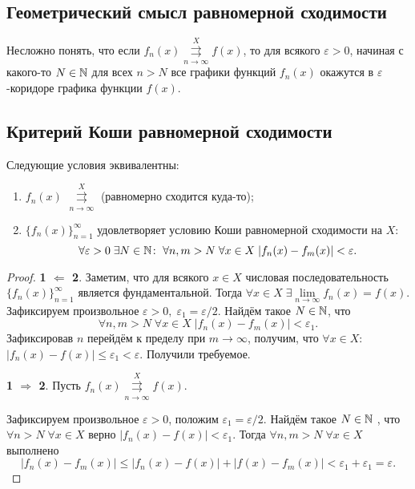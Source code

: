 	\subsection{Геометрический смысл равномерной сходимости}
	Несложно понять, что если $f_n(x) \overset{X}{\underset{n\to\infty}{\rightrightarrows}} f(x)$, то для всякого $\varepsilon > 0$, начиная с какого-то $N\in \mathbb{N}$ для всех $n>N$ все графики функций $f_n(x)$ окажутся в $\varepsilon$-коридоре графика функции $f(x)$.
	\subsection{Критерий Коши равномерной сходимости}
	\begin{Theorem}
		Следующие условия эквивалентны:
		\begin{enumerate}
			\item $f_n(x)$ $\overset{X}{\underset{n\to\infty}{\rightrightarrows}}$ (равномерно сходится куда-то);
			\item $\{f_n(x)\}_{n=1}^\infty$ удовлетворяет условию Коши равномерной сходимости на $X$:
			$$
			\forall \varepsilon > 0\; \exists N\in\mathbb{N}\colon \; \forall n,m>N\; \forall x\in X\; |f_n(x) - f_m(x)| < \varepsilon.
			$$
		\end{enumerate}
	\end{Theorem}
	\begin{proof}
		\par \textbf{1 $\Leftarrow$ 2}. Заметим, что для всякого $x\in X$ числовая последовательность $\{f_n(x)\}_{n=1}^\infty$ является фундаментальной. Тогда $\forall x\in X\; \exists \lim\limits_{n\to \infty} f_n(x) = f(x)$. Зафиксируем произвольное $\varepsilon > 0,\; \varepsilon_1 = \varepsilon / 2$. Найдём такое $N \in \mathbb{N}$, что 
		$$
			\forall n,m>N\; \forall x\in X\; |f_n(x) - f_m(x)| < \varepsilon_1.
		$$
		Зафиксировав $n$ перейдём к пределу при $m \to \infty$, получим, что $\forall x \in X:$ $|f_n(x) - f(x)| \leqslant \varepsilon_1 < \varepsilon$. Получили требуемое.
		\par \textbf{1 $\Rightarrow$ 2}. Пусть $f_n(x) \overset{X}{\underset{n\to\infty}{\rightrightarrows}} f(x)$.
		\par Зафиксируем произвольное $\varepsilon > 0$, положим $\varepsilon_1 = \varepsilon / 2$. Найдём такое $N\in \mathbb{N}$ , что $\forall n>N\; \forall x\in X$ верно $ |f_n(x) - f(x)| < \varepsilon_1$. Тогда $\forall n,m > N\; \forall x \in X$ выполнено
		$$
			|f_n(x) - f_m(x)| \leqslant |f_n(x) - f(x)| + |f(x) - f_m(x)| < \varepsilon_1 + \varepsilon_1 = \varepsilon.
		$$
	\end{proof}
